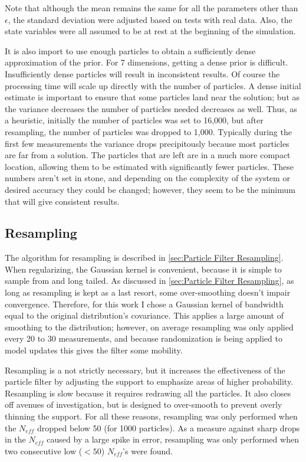 Note that although the mean remains the same for all the
parameters other than $\epsilon$, the standard deviation were
adjusted based on tests with real data. Also, the state variables
were all assumed to be at rest at the beginning of the simulation.

It is also import to use enough particles to obtain a
sufficiently dense approximation of the prior. For 7 dimensions,
getting a dense prior is difficult. Insufficiently
dense particles will result in inconsistent results. Of course the
processing time will scale up directly with the number of particles.
A dense initial estimate is important to ensure that some particles land
near the solution; but as the variance decreases the number of
particles needed decreases as well. Thus, as a heuristic, initially
the number of particles was set to 16,000, but after resampling,
the number of particles was dropped to 1,000. Typically during the
first few measurements the variance drops precipitously because
most particles are far from a solution.  The particles that are left are in a
much more compact location, allowing them to be estimated with
significantly fewer particles. These numbers aren't set in stone,
and depending on the complexity of the system or desired accuracy
they could be changed; however, they seem to be the minimum that
will give consistent results.

\subsection{Resampling}
\label{sec:Resampling}
The algorithm for resampling is described in \autoref{sec:Particle Filter Resampling}.
When regularizing, the Gaussian kernel is convenient,
because it is simple to sample from and long tailed.
As discussed in \autoref{sec:Particle Filter Resampling},
as long as resampling is kept as a last resort, some over-smoothing
doesn't impair convergence. Therefore, for this work I chose a Gaussian kernel of
bandwidth equal to the original distribution's covariance. This
applies a large amount of smoothing to the distribution; however, on average
resampling was only applied every 20 to 30 measurements, and because randomization
is being applied to model updates this gives the filter some mobility.

Resampling is a not strictly necessary, but it increases the effectiveness
of the particle filter by adjusting the support to emphasize areas
of higher probability. Resampling is slow because it requires redrawing
all the particles. It also closes off avenues of investigation, but is
designed to over-smooth to prevent overly thinning the support. For all these
reasons, resampling was only performed when the $N_{eff}$ dropped below
50 (for 1000 particles).  As a measure against sharp drops in the $N_{eff}$
caused by a large spike in error, resampling was only performed when
two consecutive low ($<50$) $N_{eff}$'s were found.

